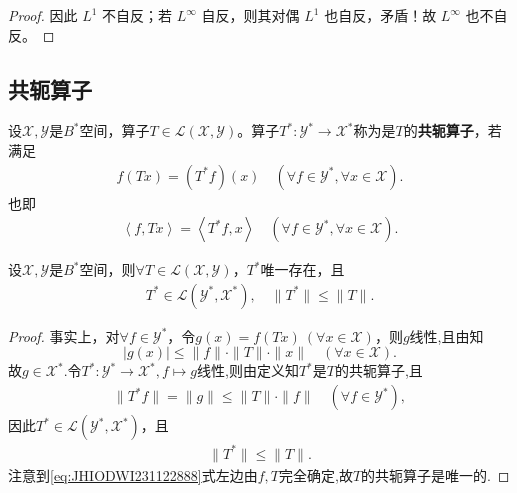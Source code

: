 \documentclass[../../main.tex]{subfiles}%
\begin{document}
\begin{proof}
因此 $L^1$ 不自反；若 $L^\infty$ 自反，则其对偶 $L^1$ 也自反，矛盾！故 $L^\infty$ 也不自反。
\end{proof}


\subsection{共轭算子}

\begin{definition}[共轭算子]
设$\mathscr{X},\mathscr{Y}$是$B^*$空间，算子$T\in\mathscr{L}(\mathscr{X},\mathscr{Y})$。算子$T^*:\mathscr{Y}^*\to\mathscr{X}^*$称为是$T$的\textbf{共轭算子}，若满足
\begin{align}\label{eq:JHIODWI231122888}
f(Tx)=(T^*f)(x)\quad (\forall f\in\mathscr{Y}^*,\forall x\in\mathscr{X}).
\end{align}
也即
\begin{align*}
\left< f,Tx \right> =\left< T^*f,x \right> \quad (\forall f\in \mathscr{Y} ^*,\forall x\in \mathscr{X} ).
\end{align*}
\end{definition}

\begin{proposition}\label{proposition:Banach空间共轭算子必存在唯一}
设$\mathscr{X},\mathscr{Y}$是$B^*$空间，则$\forall T\in\mathscr{L}(\mathscr{X},\mathscr{Y})$，$T^*$唯一存在，且
\begin{align}\label{eq:::HIOUR32s2.5.26}
T^*\in\mathscr{L}(\mathscr{Y}^*,\mathscr{X}^*),\quad \|T^*\|\leqslant\|T\|.
\end{align}
\end{proposition}
\begin{proof}
事实上，对$\forall f\in\mathscr{Y}^*$，令$g(x)=f(Tx)\ (\forall x\in\mathscr{X})$，则$g$线性,且由知
\[
|g(x)|\leqslant\|f\|\cdot\|T\|\cdot\|x\|\quad (\forall x\in\mathscr{X}).
\]
故$g\in\mathscr{X}^*$.令$T^*:\mathscr{Y}^*\to\mathscr{X}^*,f\mapsto g$线性,则由定义知$T^*$是$T$的共轭算子,且
\begin{align}
\|T^*f\|=\|g\|\leqslant\|T\|\cdot\|f\|\quad (\forall f\in\mathscr{Y}^*), \label{eq:::HIOUR32s2.5.25}
\end{align}
因此$T^*\in\mathscr{L}(\mathscr{Y}^*,\mathscr{X}^*)$，且
\begin{align*}
\|T^*\|\leqslant\|T\|. 
\end{align*}
注意到\eqref{eq:JHIODWI231122888}式左边由$f,T$完全确定,故$T$的共轭算子是唯一的.
\end{proof}
\end{document}
